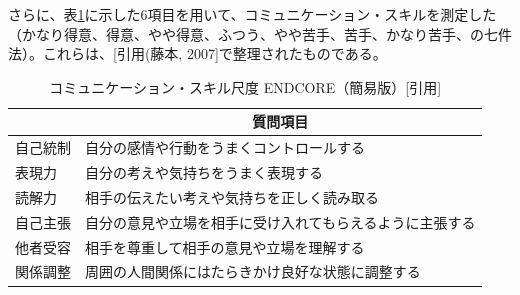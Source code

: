 \documentclass[11pt, a4paper]{jreport} %
\begin{document}
さらに、表\ref{tab:daibo3}に示した6項目を用いて、コミュニケーション・スキルを測定した（かなり得意、得意、やや得意、ふつう、やや苦手、苦手、かなり苦手、の七件法）。これらは、[引用(藤本, 2007]で整理されたものである。
\begin{table}[H]
\caption{コミュニケーション・スキル尺度 ENDCORE（簡易版）[引用]}
\label{tab:daibo3}
\centering
\begin{tabular}{@{}ll@{}}
\toprule
\multicolumn{1}{c}{} & \multicolumn{1}{c}{質問項目}     \\ \midrule
自己統制                 & 自分の感情や行動をうまくコントロールする         \\
表現力                  & 自分の考えや気持ちをうまく表現する            \\
読解力                  & 相手の伝えたい考えや気持ちを正しく読み取る        \\
自己主張                 & 自分の意見や立場を相手に受け入れてもらえるように主張する \\
他者受容                 & 相手を尊重して相手の意見や立場を理解する         \\
関係調整                 & 周囲の人間関係にはたらきかけ良好な状態に調整する     \\ \bottomrule
\end{tabular}
\end{table}
\end{document}
